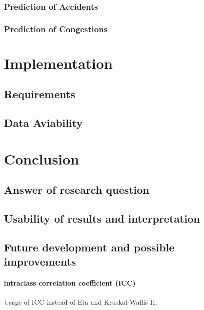 \documentclass[a4paper,headsepline,footsepline,fontsize=11pt,BCOR=12mm,DIV=12]{report}
\begin{document}
\subsection{Prediction of Accidents}

\subsection{Prediction of Congestions}

\chapter{Implementation}

\section{Requirements}

\section{Data Aviability}

\chapter{Conclusion}

\section{Answer of research question}

\section{Usability of results and interpretation}

\section{Future development and possible improvements} 

\subsubsection{intraclass correlation coefficient (ICC)}
Usage of ICC instead of Eta and Kruskal-Wallis H.
\end{document}
